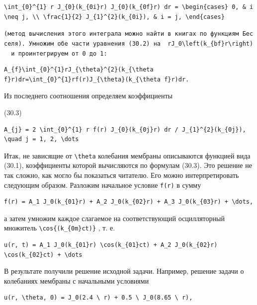 \documentclass[
  ukrainian,
]{article}
\begin{document}
\begin{verbatim}
\int_{0}^{1} r J_{0}(k_{0i}r) J_{0}(k_{0f}r) dr = \begin{cases} 0, & i \neq j, \\ \frac{1}{2} J_{1}^{2}(k_{0i}), & i = j, \end{cases}
\end{verbatim}

\texttt{(метод\ вычисления\ этого\ интеграла\ можно\ найти\ в\ книгах\ по\ функциям\ Бесселя).\ Умножим\ обе\ части\ уравнения\ (30.2)\ на\ \ \textquotesingle{}rJ\_0\textbackslash{}left(k\_\{bf\}r\textbackslash{}right)\textquotesingle{}\ \ и\ проинтегрируем\ от\ 0\ до\ 1:}

\begin{verbatim}
A_{f}\int_{0}^{1}rJ_{\theta}^{2}(k_{\theta f}r)dr=\int_{0}^{1}rf(r)J_{\theta}(k_{\theta f}r)dr.
\end{verbatim}

Из последнего соотношения определяем коэффициенты

(30.3)

\begin{verbatim}
A_{j} = 2 \int_{0}^{1} r f(r) J_{0}(k_{0j}r) dr / J_{1}^{2}(k_{0j}), \quad j = 1, 2, \dots
\end{verbatim}

Итак, не зависящие от \texttt{\textbackslash{}theta} колебания мембраны
описываются функцией вида (30.1), коэффициенты которой вычисляются по
формулам (30.3). Это решение не так сложно, как могло бы показаться
читателю. Его можно интерпретировать следующим образом. Разложим
начальное условие \texttt{f(r)} в сумму

\begin{verbatim}
f(r) = A_1 J_0(k_{01}r) + A_2 J_0(k_{02}r) + A_3 J_0(k_{03}r) + \dots,
\end{verbatim}

а затем умножим каждое слагаемое на соответствующий осцилляторный
множитель \texttt{\textbackslash{}cos\{(k\_\{0m\}ct)\}} , т. е.

\begin{verbatim}
u(r, t) = A_1 J_0(k_{01}r) \cos(k_{01}ct) + A_2 J_0(k_{02}r) \cos(k_{02}ct) + \dots
\end{verbatim}

В результате получили решение исходной задачи. Например, решение задачи
о колебаниях мембраны с начальными условиями

\begin{verbatim}
u(r, \theta, 0) = J_0(2.4 \ r) + 0.5 \ J_0(8.65 \ r),
\end{verbatim}
\end{document}
